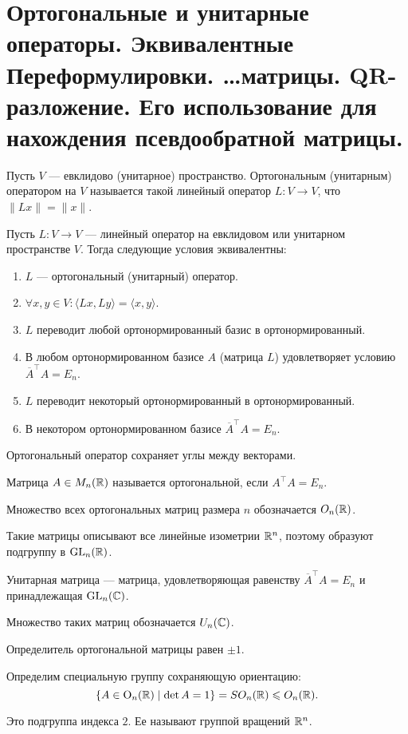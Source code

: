 \section{Ортогональные и унитарные операторы. Эквивалентные Переформулировки. \ldots матрицы. QR-разложение. Его использование для нахождения псевдообратной матрицы.}

\begin{defn}
    Пусть $ V$ --- евклидово (унитарное) пространство. {\sf Ортогональным (унитарным)} оператором на  $ V$ называется такой линейный оператор $ L\colon V \to  V$, что $ \| Lx \| = \| x \| $.
\end{defn}
\begin{thm}
    Пусть $ L \colon V \to  V$ --- линейный оператор на евклидовом или унитарном пространстве $ V$. Тогда следующие условия эквивалентны:
     \begin{enumerate}[noitemsep]
	 \item $ L$ --- ортогональный (унитарный) оператор.
	 \item  $ \forall x, y \in V\colon \langle Lx, Ly \rangle = \langle x, y \rangle$.
	 \item $ L$ переводит любой ортонормированный базис в ортонормированный. 
	 \item В любом ортонормированном базисе  $ A$ (матрица  $ L$) удовлетворяет условию  $ \overline{A}^{\top} A = E_n$.
	 \item $ L$ переводит некоторый ортонормированный в ортонормированный.
	 \item В некотором ортонормированном базисе $ \overline{A}^{\top}A = E_n$.
    \end{enumerate} 
\end{thm}
\begin{cor}
    Ортогональный оператор сохраняет углы между векторами.
\end{cor}
\begin{defn}
    Матрица $ A \in M_n(\mathbb{R})$ называется {\sf ортогональной}, если $ A^{\top} A = E_n$. 
    \begin{name}
	Множество всех ортогональных матриц размера $ n$ обозначается  $ O_n(\mathbb{R})$. 
    \end{name}
    \begin{note}
Такие матрицы описывают все линейные изометрии  $ \mathbb{R}^{n}$, поэтому образуют подгруппу в $ {\mathop{\text{\rm GL}}}_n(\mathbb{R})$.
\end{note}
\end{defn}
\begin{defn}
    {\sf Унитарная матрица} --- матрица, удовлетворяющая равенству $ \overline{A}^{\top}A = E_n$ и принадлежащая $ {\mathop{\text{\rm GL}}}_n(\mathbb{C})$. 
    \begin{name}
	Множество таких матриц обозначается $ U_n(\mathbb{C})$.
    \end{name}
    \begin{note}
	Определитель ортогональной матрицы равен $ \pm 1$.
    \end{note}
\end{defn}
    \begin{defn}
	Определим специальную группу сохраняющую ориентацию:
	\[
	    \{A \in {\mathop{\text{\rm O}}}_n(\mathbb{R}) \mid \det A = 1 \} = SO_n(\mathbb{R}) \leqslant O_n(\mathbb{R})
	.\] 
	\begin{note}
	    Это подгруппа индекса $ 2$. Ее называют  {\sf группой вращений} $ \mathbb{R}^{n}$. 
	\end{note}
    \end{defn}


